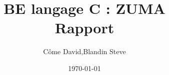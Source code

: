 \usepackage[francais]{babel}
\usepackage[utf8]{inputenc}
\usepackage[T1]{fontenc}
\usepackage[usenames,dvipsnames]{xcolor}
\usepackage{amsmath}
\usepackage{graphicx}
\usepackage{float} 
\usepackage{geometry} 
\usepackage{listings}
\usepackage{multirow}
\usepackage{subfigure}
\usepackage{multicol}
\usepackage{url}
\usepackage{underscore}

\geometry{hmargin=2cm,bottom=3cm,top=2cm}

\usepackage{titling}
\title{BE langage C : ZUMA \\ Rapport}
\date{\today}

\author{Côme David,Blandin Steve}

